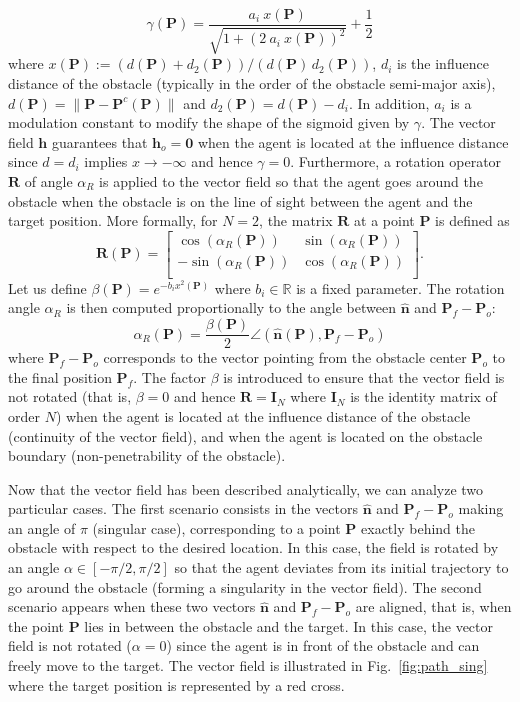 \[
    \gamma(\bm{P}) = \frac{a_i \ x(\bm{P})}{\sqrt{1+(2 \ a_i \ x(\bm{P}))^2}} + \frac{1}{2}
\]
where $x(\bm{P}) := (d(\bm{P})+d_2(\bm{P})) / (d(\bm{P}) \, d_2(\bm{P}))$, $d_i$ is the influence distance of the obstacle (typically in the order of the obstacle semi-major axis), $d(\bm{P}) = \|\bm{P}-\bm{P}^c(\bm{P})\|$ and $d_2(\bm{P}) = d(\bm{P})-d_i$. In addition, $a_i$ is a modulation constant to modify the shape of the sigmoid given by $\gamma$.
The vector field $\bm{h}$ guarantees that $\bm{h}_o = \bm{0}$ when the agent is located at the influence distance since $d=d_i$ implies $x \rightarrow -\infty$ and hence $\gamma = 0$.
Furthermore, a rotation operator $\bm{R}$ of angle $\alpha_R$ is applied to the vector field so that the agent goes around the obstacle when the obstacle is on the line of sight between the agent and the target position. 
More formally, for $N=2$, the matrix $\bm{R}$ at a point $\bm{P}$ is defined as 
\[
    \bm{R}(\bm{P}) = 
    \begin{bmatrix}
     \cos(\alpha_R(\bm{P})) & \sin(\alpha_R(\bm{P})) \\
     - \sin(\alpha_R(\bm{P})) & \cos(\alpha_R(\bm{P})) \\
    \end{bmatrix}.
\]
Let us define $\beta(\bm{P}) = e^{-b_i x^2(\bm{P})}$ where $b_i \in \mathbb{R}$ is a fixed parameter. The rotation angle $\alpha_R$ is then computed proportionally to the angle between $\hat{\bm{n}}$ and $\bm{P}_f-\bm{P}_o$:
\[
    \alpha_R(\bm{P}) = \frac{\beta(\bm{P})}{2} \angle ( \hat{\bm{n}}(\bm{P}), \bm{P}_f-\bm{P}_o)
\]
where $\bm{P}_f-\bm{P}_o$ corresponds to the vector pointing from the obstacle center $\bm{P}_o$ to the final position  $\bm{P}_f$. The factor $\beta$ is introduced to ensure that the vector field is not rotated (that is, $\beta = 0$ and hence $\bm{R} = \bm{I}_N$ where $\bm{I}_N$ is the identity matrix of order $N$) when the agent is located at the influence distance of the obstacle (continuity of the vector field), and when the agent is located on the obstacle boundary (non-penetrability of the obstacle).

Now that the vector field has been described analytically, we can analyze two particular cases. The first scenario consists in the vectors $\hat{\bm{n}}$ and $\bm{P}_f-\bm{P}_o$ making an angle of $\pi$ (singular case), corresponding to a point $\bm{P}$ exactly behind the obstacle with respect to the desired location. In this case, the field is rotated by an angle $\alpha \in [-\pi/2,\pi/2]$ so that the agent deviates from its initial trajectory to go around the obstacle (forming a singularity in the vector field). The second scenario appears when these two vectors $\hat{\bm{n}}$ and $\bm{P}_f-\bm{P}_o$ are aligned, that is, when the point $\bm{P}$ lies in between the obstacle and the target. In this case, the vector field is not rotated ($\alpha = 0$) since the agent is in front of the obstacle and can freely move to the target. The vector field is illustrated in Fig.~\ref{fig:path_sing} where the target position is represented by a red cross.

